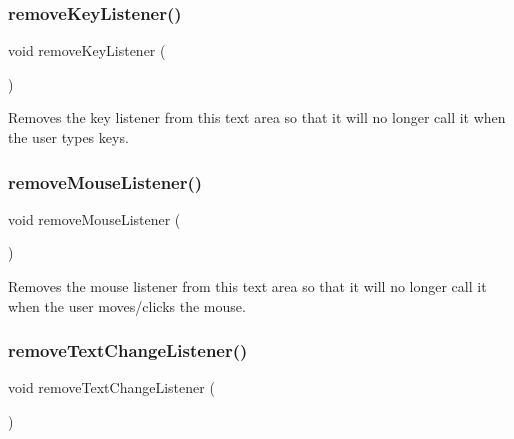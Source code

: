 \mbox{\label{classGTextArea_a43095f41cab3be732b49f29970484b05}} 
\subsubsection{\texorpdfstring{remove\+Key\+Listener()}{removeKeyListener()}}
{\footnotesize\ttfamily void remove\+Key\+Listener (\begin{DoxyParamCaption}{ }\end{DoxyParamCaption})\hspace{0.3cm}{\ttfamily [virtual]}}



Removes the key listener from this text area so that it will no longer call it when the user types keys. 

\mbox{\label{classGTextArea_aff47f71ce47e688a07c9d38dc92fcc11}} 
\subsubsection{\texorpdfstring{remove\+Mouse\+Listener()}{removeMouseListener()}}
{\footnotesize\ttfamily void remove\+Mouse\+Listener (\begin{DoxyParamCaption}{ }\end{DoxyParamCaption})\hspace{0.3cm}{\ttfamily [virtual]}}



Removes the mouse listener from this text area so that it will no longer call it when the user moves/clicks the mouse. 

\mbox{\label{classGTextArea_a69c940b99d01eb7c353763ce4b0942a4}} 
\subsubsection{\texorpdfstring{remove\+Text\+Change\+Listener()}{removeTextChangeListener()}}
{\footnotesize\ttfamily void remove\+Text\+Change\+Listener (\begin{DoxyParamCaption}{ }\end{DoxyParamCaption})\hspace{0.3cm}{\ttfamily [virtual]}}



